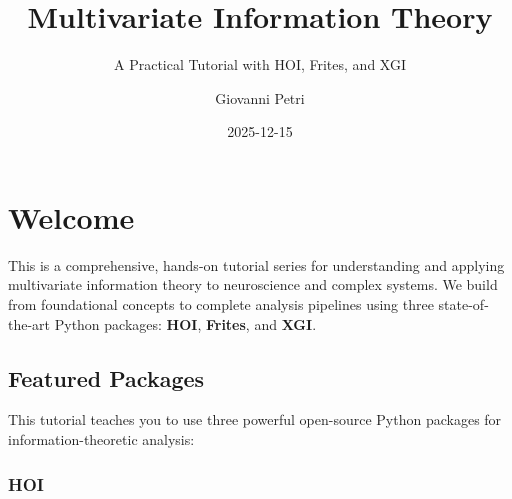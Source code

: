 \documentclass[
  11pt,
  letterpaper,
  oneside,
  openany]{book}
\title{Multivariate Information Theory}
\subtitle{A Practical Tutorial with HOI, Frites, and XGI}
\author{Giovanni Petri}
\date{2025-12-15}
\renewcommand*\contentsname{Table of contents}
\newcommand\contentsname{Table of contents}
\begin{document}
\frontmatter
\maketitle

\renewcommand*\contentsname{Table of contents}
{
\hypersetup{linkcolor=}
\setcounter{tocdepth}{2}
\tableofcontents
}

\mainmatter
{}

\chapter*{Welcome}\label{welcome}


\begin{tcolorbox}[enhanced jigsaw, colbacktitle=quarto-callout-note-color!10!white, colframe=quarto-callout-note-color-frame, toprule=.15mm, toptitle=1mm, bottomtitle=1mm, leftrule=.75mm, titlerule=0mm, title=\textcolor{quarto-callout-note-color}{\faInfo}\hspace{0.5em}{About This Tutorial}, arc=.35mm, rightrule=.15mm, opacityback=0, breakable, opacitybacktitle=0.6, bottomrule=.15mm, left=2mm, coltitle=black, colback=white]

This is a comprehensive, hands-on tutorial series for understanding and
applying multivariate information theory to neuroscience and complex
systems. We build from foundational concepts to complete analysis
pipelines using three state-of-the-art Python packages: \textbf{HOI},
\textbf{Frites}, and \textbf{XGI}.

\end{tcolorbox}

\section*{Featured Packages}\label{featured-packages}


This tutorial teaches you to use three powerful open-source Python
packages for information-theoretic analysis:

\subsection*{HOI}\label{hoi}
\end{document}
